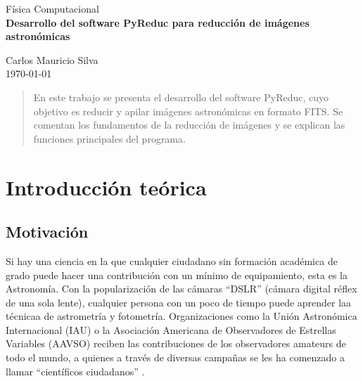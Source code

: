 \documentclass[a4paper, 12pt]{article}
\begin{document}
\begin{titlepage}
\vspace{0.5cm}

\begin{center}
\normalsize{\sc Física Computacional}\\
\vspace{0.5cm}
\Large{\bf Desarrollo del software PyReduc para reducción de imágenes astronómicas}\\


\vspace{5cm}

\normalsize
Carlos Mauricio Silva\\

\vspace*{0.5cm}
\small{\today}

\vspace*{3cm}

\begin{abstract}
  En este trabajo se presenta el desarrollo del software PyReduc, cuyo objetivo es reducir y apilar imágenes astronómicas en formato FITS. Se comentan los fundamentos de la reducción de imágenes y se explican las funciones principales del programa.
\end{abstract}

\vspace{5cm}

\normalsize

\end{center}
\end{titlepage}


\pagestyle{fancy}
\renewcommand{\footrulewidth}{0.6pt}


\section{Introducción teórica}
\subsection{Motivación}
Si hay una ciencia en la que cualquier ciudadano sin formación académica de grado puede hacer una contribución con un mínimo de equipamiento, esta es la Astronomía. Con la popularización de las cámaras ``DSLR'' (cámara digital réflex de una sola lente), cualquier persona con un poco de tiempo puede aprender laa técnicaa de astrometría y fotometría. Organizaciones como la Unión Astronómica Internacional (IAU) o la Asociación Americana de Observadores de Estrellas Variables (AAVSO) reciben las contribuciones de los observadores amateurs de todo el mundo, a quienes a través de diversas campañas se les ha comenzado a llamar ``científicos ciudadanos'' \cite{aavso}.
\end{document}
